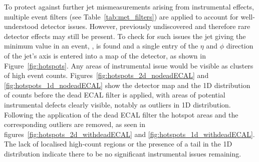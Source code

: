 To protect against further jet mismeasurements arising from
instrumental effects, multiple event filters (see Table~\ref{tab:met_filters})
are applied to account for well-understood detector issues. However, previously
undiscovered and therefore rare detector effects may still be
present. To check for such issues the
jet giving the minimum \dphistar value in an event, \mindphistar, is found
and a single entry of the $\eta$ and $\phi$ direction of the jet's axis is entered
into a map of the detector, as shown in Figure~\ref{fig:hotspots}. Any areas of
instrumental issue would
be visible as clusters of high event counts.
Figures~\ref{fig:hotspots_2d_nodeadECAL} and \ref{fig:hotspots_1d_nodeadECAL}
show the detector map and the 1D distribution
of counts before the dead ECAL filter is applied, with areas of
potential instrumental defects clearly visible, notably as outliers in
1D distribution. Following the application of the dead
ECAL filter the hotspot areas and the corresponding outliers are removed, as
seen in figures~\ref{fig:hotspots_2d_withdeadECAL} and
\ref{fig:hotspots_1d_withdeadECAL}. The lack of localised high-count regions or
the presence of a tail in the 1D distribution indicate there to be
no significant instrumental issues remaining.

